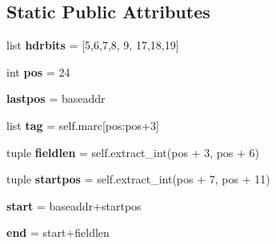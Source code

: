 \subsection*{Static Public Attributes}
\begin{DoxyCompactItemize}
\item 
\hypertarget{classcheshire3_1_1marc__utils_1_1_m_a_r_c_a2fb31f74ae35b42e70cf460cbc9d2a35}{list {\bfseries hdrbits} = \mbox{[}5,6,7,8, 9, 17,18,19\mbox{]}}\label{classcheshire3_1_1marc__utils_1_1_m_a_r_c_a2fb31f74ae35b42e70cf460cbc9d2a35}

\item 
\hypertarget{classcheshire3_1_1marc__utils_1_1_m_a_r_c_ade14385fadc203cae7fcf13bca081b45}{int {\bfseries pos} = 24}\label{classcheshire3_1_1marc__utils_1_1_m_a_r_c_ade14385fadc203cae7fcf13bca081b45}

\item 
\hypertarget{classcheshire3_1_1marc__utils_1_1_m_a_r_c_a86da6e2eb3fe5320bbd1eb2874b59988}{{\bfseries lastpos} = baseaddr}\label{classcheshire3_1_1marc__utils_1_1_m_a_r_c_a86da6e2eb3fe5320bbd1eb2874b59988}

\item 
\hypertarget{classcheshire3_1_1marc__utils_1_1_m_a_r_c_a493c2ece80e763b849b739b3a16f8bd2}{list {\bfseries tag} = self.\-marc\mbox{[}pos\-:pos+3\mbox{]}}\label{classcheshire3_1_1marc__utils_1_1_m_a_r_c_a493c2ece80e763b849b739b3a16f8bd2}

\item 
\hypertarget{classcheshire3_1_1marc__utils_1_1_m_a_r_c_a2d06c95521377538a1da269e6f0279aa}{tuple {\bfseries fieldlen} = self.\-extract\-\_\-int(pos + 3, pos + 6)}\label{classcheshire3_1_1marc__utils_1_1_m_a_r_c_a2d06c95521377538a1da269e6f0279aa}

\item 
\hypertarget{classcheshire3_1_1marc__utils_1_1_m_a_r_c_aff58871153b3ded2cb769e656d2e9529}{tuple {\bfseries startpos} = self.\-extract\-\_\-int(pos + 7, pos + 11)}\label{classcheshire3_1_1marc__utils_1_1_m_a_r_c_aff58871153b3ded2cb769e656d2e9529}

\item 
\hypertarget{classcheshire3_1_1marc__utils_1_1_m_a_r_c_af318c403b8cc3e453bff4ced89e2c04b}{{\bfseries start} = baseaddr+startpos}\label{classcheshire3_1_1marc__utils_1_1_m_a_r_c_af318c403b8cc3e453bff4ced89e2c04b}

\item 
\hypertarget{classcheshire3_1_1marc__utils_1_1_m_a_r_c_a0f3e29f3434cfae3d25bf73af9ace9d6}{{\bfseries end} = start+fieldlen}\label{classcheshire3_1_1marc__utils_1_1_m_a_r_c_a0f3e29f3434cfae3d25bf73af9ace9d6}


\end{DoxyCompactItemize}
